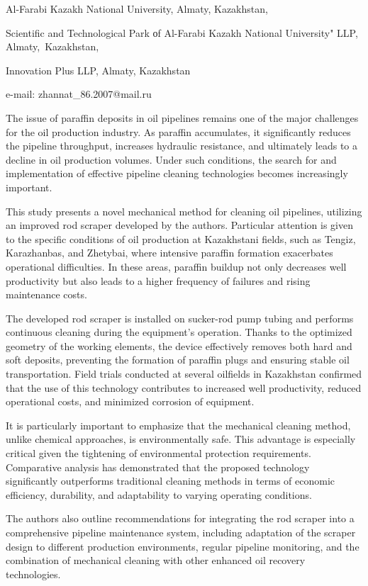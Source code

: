 \begin{affil}
Al-Farabi Kazakh National University, Almaty, Kazakhstan,

Scientific and Technological Park оf Al-Farabi Kazakh National University" LLP, Almaty,~Kazakhstan,

Innovation Plus LLP, Almaty, Kazakhstan

e-mail: zhannat\_86.2007@mail.ru
\end{affil}

The issue of paraffin deposits in oil pipelines remains one of the major
challenges for the oil production industry. As paraffin accumulates, it
significantly reduces the pipeline throughput, increases hydraulic
resistance, and ultimately leads to a decline in oil production volumes.
Under such conditions, the search for and implementation of effective
pipeline cleaning technologies becomes increasingly important.

This study presents a novel mechanical method for cleaning oil
pipelines, utilizing an improved rod scraper developed by the authors.
Particular attention is given to the specific conditions of oil
production at Kazakhstani fields, such as Tengiz, Karazhanbas, and
Zhetybai, where intensive paraffin formation exacerbates operational
difficulties. In these areas, paraffin buildup not only decreases well
productivity but also leads to a higher frequency of failures and rising
maintenance costs.

The developed rod scraper is installed on sucker-rod pump tubing and
performs continuous cleaning during the equipment's operation. Thanks to
the optimized geometry of the working elements, the device effectively
removes both hard and soft deposits, preventing the formation of
paraffin plugs and ensuring stable oil transportation. Field trials
conducted at several oilfields in Kazakhstan confirmed that the use of
this technology contributes to increased well productivity, reduced
operational costs, and minimized corrosion of equipment.

It is particularly important to emphasize that the mechanical cleaning
method, unlike chemical approaches, is environmentally safe. This
advantage is especially critical given the tightening of environmental
protection requirements. Comparative analysis has demonstrated that the
proposed technology significantly outperforms traditional cleaning
methods in terms of economic efficiency, durability, and adaptability to
varying operating conditions.

The authors also outline recommendations for integrating the rod scraper
into a comprehensive pipeline maintenance system, including adaptation
of the scraper design to different production environments, regular
pipeline monitoring, and the combination of mechanical cleaning with
other enhanced oil recovery technologies.

